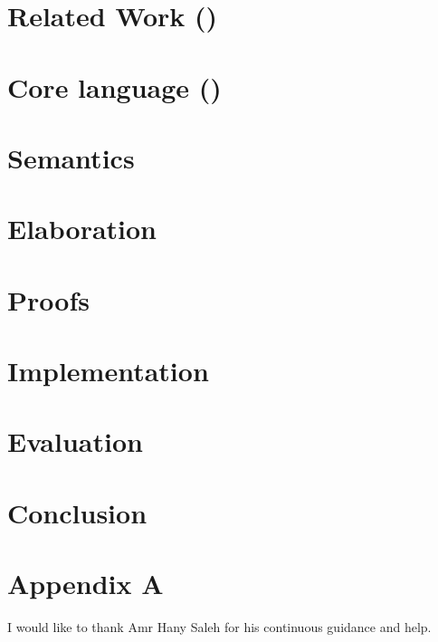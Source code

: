 \documentclass[sigplan,10pt]{acmart}\settopmatter{printfolios=true}
\begin{document}
\section{Related Work (\eff)}




\section{Core language (\core)}




\section{Semantics}


\section{Elaboration}


\section{Proofs}


\section{Implementation}


\section{Evaluation}


\section{Conclusion}


\appendix
\section{Appendix A}


\begin{acks}
  I would like to thank Amr Hany Saleh for his continuous guidance and help.
\end{acks}


\end{document}
